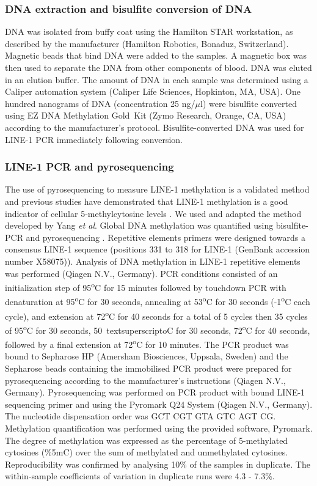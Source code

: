 \subsubsection{DNA extraction and bisulfite conversion of DNA} %
\noindent DNA was isolated from buffy coat using the Hamilton STAR workstation, as described by the manufacturer (Hamilton Robotics, Bonaduz, Switzerland). Magnetic beads that bind DNA were added to the samples. A magnetic box was then used to separate the DNA from other components of blood. DNA was eluted in an elution buffer. The amount of DNA in each sample was determined using a Caliper automation system (Caliper Life Sciences, Hopkinton, MA, USA). One hundred nanograms of DNA (concentration 25 ng/$\mu$l) were bisulfite converted using EZ DNA Methylation Gold\texttrademark~Kit (Zymo Research, Orange, CA, USA) according to the manufacturer's protocol. Bisulfite-converted DNA was used for LINE-1 PCR immediately following conversion. 

\subsubsection{LINE-1 PCR and pyrosequencing} %
\noindent The use of pyrosequencing to measure LINE-1 methylation is a validated method and previous studies have demonstrated that LINE-1 methylation is a good indicator of cellular 5-methylcytosine levels \cite{c56}. We used and adapted the method developed by Yang \emph{et al}. Global DNA methylation was quantified using bisulfite-PCR and pyrosequencing \cite{c56}. Repetitive elements primers were designed towards a consensus LINE-1 sequence (positions 331 to 318 for LINE-1 (GenBank accession number X58075)). Analysis of DNA methylation in LINE-1 repetitive elements was performed (Qiagen N.V., Germany). PCR conditions consisted of an initialization step of 95\textsuperscript{o}C for 15 minutes followed by touchdown PCR with denaturation at 95\textsuperscript{o}C for 30 seconds, annealing at 53\textsuperscript{o}C for 30 seconds (-1\textsuperscript{o}C each cycle), and extension at 72\textsuperscript{o}C for 40 seconds for a total of 5 cycles then 35 cycles of 95\textsuperscript{o}C for 30 seconds, 50\
textsuperscript{o}C for 30 seconds, 72\textsuperscript{o}C for 40 seconds, followed by a final extension at 72\textsuperscript{o}C for 10 minutes. The PCR product was bound to Sepharose HP (Amersham Biosciences, Uppsala, Sweden) and the Sepharose beads containing the immobilised PCR product were prepared for pyrosequencing according to the manufacturer's instructions (Qiagen N.V., Germany). Pyrosequencing was performed on PCR product with bound LINE-1 sequencing primer and using the Pyromark Q24 System (Qiagen N.V., Germany). The nucleotide dispensation order was GCT CGT GTA GTC AGT CG. Methylation quantification was performed using the provided software, Pyromark. The degree of methylation was expressed as the percentage of 5-methylated cytosines (\%5mC) over the sum of methylated and unmethylated cytosines. Reproducibility was confirmed by analysing 10\% of the samples in duplicate. The within-sample coefficients of variation in duplicate runs were 4.3 - 7.3\%.

